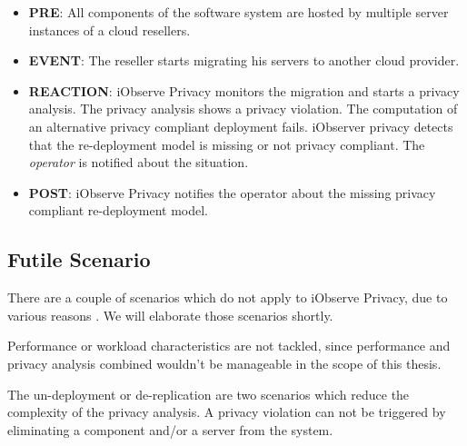 \begin{itemize}
	\setlength\itemsep{0em}
	\item \textbf{PRE}: All components of the software system are hosted by multiple server instances of a cloud resellers. 
	\item \textbf{EVENT}: The reseller starts migrating his servers to another cloud provider.
	\item \textbf{REACTION}: iObserve Privacy monitors the migration and starts a privacy analysis. The privacy analysis shows a privacy violation. The computation of an alternative privacy compliant deployment fails. iObserver privacy detects that the re-deployment model is missing or not privacy compliant. The \textit{operator} is notified about the situation.
	\item \textbf{POST}: iObserve Privacy notifies the operator about the missing privacy compliant re-deployment model.
\end{itemize}


\subsection{Futile Scenario}
\label{eval:scenario:futile}
There are a couple of scenarios which do not apply to iObserve Privacy, due to various reasons \cite{Heinrich.2016b}. We will elaborate those scenarios shortly.

Performance or workload characteristics are not tackled, since performance and privacy analysis combined wouldn't be manageable in the scope of this thesis.

The un-deployment or de-replication are two scenarios which reduce the complexity of the privacy analysis. A privacy violation can not be triggered by eliminating a component and/or a server from the system.


